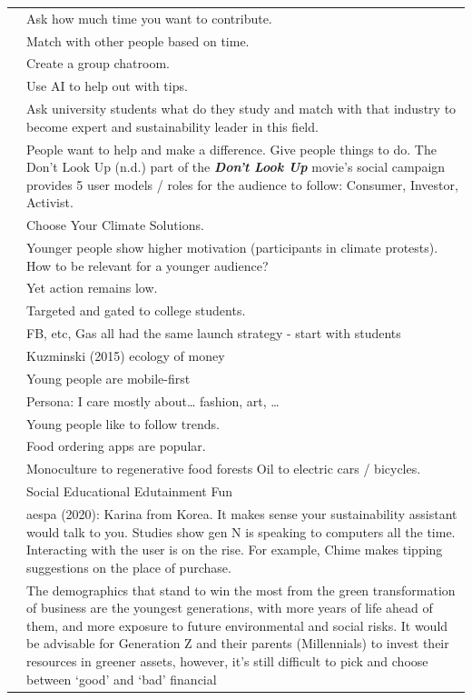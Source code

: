 \documentclass[
  letterpaper,
  DIV=11,
  numbers=noendperiod]{scrartcl}
\begin{document}
\begin{longtable}[]{@{}
  >{\raggedright\arraybackslash}p{}
  >{\raggedright\arraybackslash}p{}@{}}
& Ask how much time you want to contribute. \\
& Match with other people based on time. \\
& Create a group chatroom. \\
& Use AI to help out with tips. \\
& Ask university students what do they study and match with that
industry to become expert and sustainability leader in this field. \\
& People want to help and make a difference. Give people things to do.
The Don't Look Up (n.d.) part of the \textbf{\emph{Don't Look Up}}
movie's social campaign provides 5 user models / roles for the audience
to follow: Consumer, Investor, Activist. \\
& Choose Your Climate Solutions. \\
& Younger people show higher motivation (participants in climate
protests). How to be relevant for a younger audience? \\
& Yet action remains low. \\
& Targeted and gated to college students. \\
& FB, etc, Gas all had the same launch strategy - start with students \\
& Kuzminski (2015) ecology of money \\
& Young people are mobile-first \\
& Persona: I care mostly about\ldots{} fashion, art, \ldots{} \\
& Young people like to follow trends. \\
& Food ordering apps are popular. \\
& Monoculture to regenerative food forests Oil to electric cars /
bicycles. \\
& Social Educational Edutainment Fun \\
& aespa (2020): Karina from Korea. It makes sense your sustainability
assistant would talk to you. Studies show gen N is speaking to computers
all the time. Interacting with the user is on the rise. For example,
Chime makes tipping suggestions on the place of purchase. \\
& The demographics that stand to win the most from the green
transformation of business are the youngest generations, with more years
of life ahead of them, and more exposure to future environmental and
social risks. It would be advisable for Generation Z and their parents
(Millennials) to invest their resources in greener assets, however, it's
still difficult to pick and choose between `good' and `bad' financial

\end{longtable}
\end{document}
